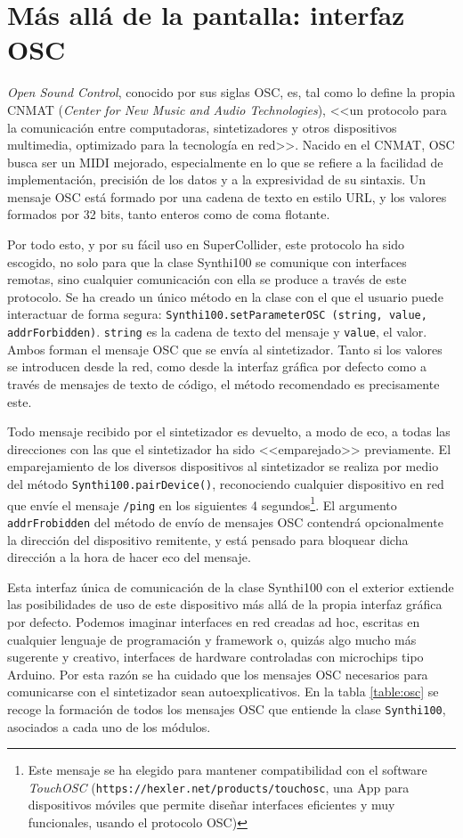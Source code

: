 \section{Más allá de la pantalla: interfaz OSC}

\textit{Open Sound Control}, conocido por sus siglas OSC, es, tal como lo define la propia CNMAT (\textit{Center for New Music and Audio Technologies}), <<un protocolo para la comunicación entre computadoras, sintetizadores y otros dispositivos multimedia, optimizado para la tecnología en red>>. Nacido en el CNMAT, OSC busca ser un MIDI mejorado, especialmente en lo que se refiere a la facilidad de implementación, precisión de los datos y a la expresividad de su sintaxis. Un mensaje OSC está formado por una cadena de texto en estilo URL, y los valores formados por 32 bits, tanto enteros como de coma flotante. 

Por todo esto, y por su fácil uso en SuperCollider, este protocolo ha sido escogido, no solo para que la clase Synthi100 se comunique con interfaces remotas, sino cualquier comunicación con ella se produce a través de este protocolo. Se ha creado un único método en la clase con el que el usuario puede interactuar de forma segura: \texttt{Synthi100.setParameterOSC (string, value, addrForbidden)}. \texttt{string} es la cadena de texto del mensaje y \texttt{value}, el valor. Ambos forman el mensaje OSC que se envía al sintetizador. Tanto si los valores se introducen desde la red, como desde la interfaz gráfica por defecto como a través de mensajes de texto de código, el método recomendado es precisamente este.

Todo mensaje recibido por el sintetizador es devuelto, a modo de eco, a todas las direcciones con las que el sintetizador ha sido <<emparejado>> previamente. El emparejamiento de los diversos dispositivos al sintetizador se realiza por medio del método \texttt{Synthi100.pairDevice()}, reconociendo cualquier dispositivo en red que envíe el mensaje \texttt{/ping} en los siguientes 4 segundos\footnote{Este mensaje se ha elegido para mantener compatibilidad con el software \textit{TouchOSC} (\texttt{https://hexler.net/products/touchosc}, una App para dispositivos móviles que permite diseñar interfaces eficientes y muy funcionales, usando el protocolo OSC)}. El argumento \texttt{addrFrobidden} del método de envío de mensajes OSC contendrá opcionalmente la dirección del dispositivo remitente, y está pensado para bloquear dicha dirección a la hora de hacer eco del mensaje.

Esta interfaz única de comunicación de la clase Synthi100 con el exterior extiende las posibilidades de uso de este dispositivo más allá de la propia interfaz gráfica por defecto. Podemos imaginar interfaces en red creadas ad hoc, escritas en cualquier lenguaje de programación y framework o, quizás algo mucho más sugerente y creativo, interfaces de hardware controladas con microchips tipo Arduino. Por esta razón se ha cuidado que los mensajes OSC necesarios para comunicarse con el sintetizador sean autoexplicativos. En la tabla \ref{table:osc} se recoge la formación de todos los mensajes OSC que entiende la clase \texttt{Synthi100}, asociados a cada uno de los módulos.

